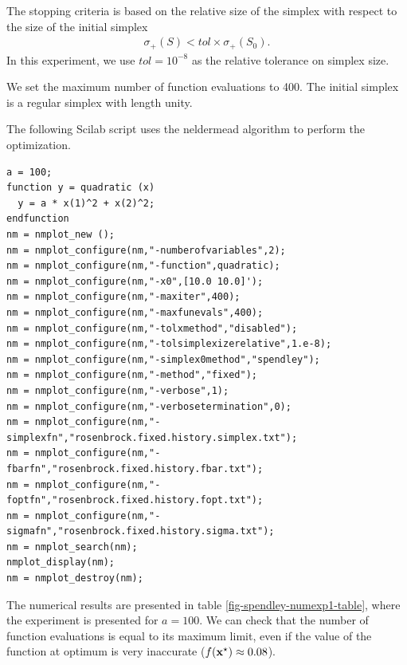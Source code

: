 The stopping criteria is based on the relative size of the simplex 
with respect to the size of the initial simplex 
\begin{eqnarray}
\sigma_+(S) < tol \times \sigma_+(S_0).
\end{eqnarray}
In this experiment, we use $tol=10^{-8}$ as the relative tolerance 
on simplex size.

We set the maximum number of function evaluations to 400.
The initial simplex is a regular simplex with length unity.

The following Scilab script uses the neldermead algorithm to perform the 
optimization.

\lstset{language=scilabscript}
\begin{lstlisting}
a = 100;
function y = quadratic (x)
  y = a * x(1)^2 + x(2)^2;
endfunction
nm = nmplot_new ();
nm = nmplot_configure(nm,"-numberofvariables",2);
nm = nmplot_configure(nm,"-function",quadratic);
nm = nmplot_configure(nm,"-x0",[10.0 10.0]');
nm = nmplot_configure(nm,"-maxiter",400);
nm = nmplot_configure(nm,"-maxfunevals",400);
nm = nmplot_configure(nm,"-tolxmethod","disabled");
nm = nmplot_configure(nm,"-tolsimplexizerelative",1.e-8);
nm = nmplot_configure(nm,"-simplex0method","spendley");
nm = nmplot_configure(nm,"-method","fixed");
nm = nmplot_configure(nm,"-verbose",1);
nm = nmplot_configure(nm,"-verbosetermination",0);
nm = nmplot_configure(nm,"-simplexfn","rosenbrock.fixed.history.simplex.txt");
nm = nmplot_configure(nm,"-fbarfn","rosenbrock.fixed.history.fbar.txt");
nm = nmplot_configure(nm,"-foptfn","rosenbrock.fixed.history.fopt.txt");
nm = nmplot_configure(nm,"-sigmafn","rosenbrock.fixed.history.sigma.txt");
nm = nmplot_search(nm);
nmplot_display(nm);
nm = nmplot_destroy(nm);
\end{lstlisting}


The numerical results are presented in table \ref{fig-spendley-numexp1-table},
where the experiment is presented for $a=100$. We can check that the 
number of function evaluations is equal to its maximum limit, even if the value of the 
function at optimum is very inaccurate ($f(\mathbf{x}^\star) \approx 0.08$).

